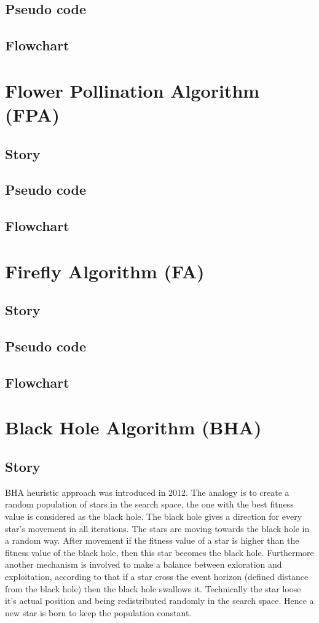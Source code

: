 \documentclass[border=0.2cm]{report}
\begin{document}
\section{Pseudo code}
\section{Flowchart}

\chapter{Flower Pollination Algorithm (FPA)}
\section{Story}
\section{Pseudo code}
\section{Flowchart}

\chapter{Firefly Algorithm (FA)}
\section{Story}
\section{Pseudo code}
\section{Flowchart}

\chapter{Black Hole Algorithm (BHA)}
\section{Story}

BHA \cite{bha1, bha2} heuristic approach was introduced in 2012. The analogy is to create a random population of stars in the search space, the one with the best fitness value is considered as the black hole. The black hole gives a direction for every star's movement in all iterations. The stars are moving towards the black hole in a random way. After movement if the fitness value of a star is higher than the fitness value of the black hole, then this star becomes the black hole. Furthermore another mechanism is involved to make a balance between exloration and exploitation, according to that if a star cross the event horizon (defined distance from the black hole) then the black hole swallows it. Technically the star loose it's actual position and being redistributed randomly in the search space. Hence a new star is born to keep the population constant. \\
\end{document}

